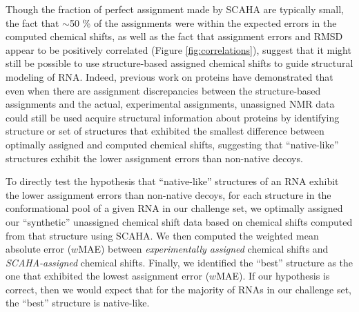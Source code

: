 \documentclass[journal=jcisd8,manuscript=article,layout=onecolumn]{achemso}
\begin{document}
{Though the fraction of perfect assignment made by SCAHA are typically small, the fact that $\sim$50 \% of the assignments were within the expected errors  in the computed chemical shifts, as well as the fact that assignment errors and RMSD appear to be positively correlated (Figure \ref{fig:correlations}), suggest that it  might still be possible to use structure-based assigned chemical shifts to guide structural modeling of RNA. Indeed, previous work on proteins have demonstrated that even when there are assignment discrepancies between the structure-based assignments and the actual, experimental assignments\cite{meiler2003rapid, bermejo2008deuterated, courtney2015experimental}, unassigned NMR data could still be used acquire structural information about proteins by identifying structure or set of structures that exhibited the smallest difference between optimally assigned and computed chemical shifts, suggesting that “native-like” structures exhibit the lower assignment errors than non-native decoys. 

To directly test the hypothesis that “native-like” structures of an RNA exhibit the lower assignment errors than non-native decoys, for each structure in the conformational pool of a given RNA in our challenge set, we optimally assigned our ``synthetic'' unassigned chemical shift data based on chemical shifts computed from that structure using SCAHA. We then computed the weighted mean absolute error ($w$MAE) between \textit{experimentally assigned} chemical shifts and \textit{SCAHA-assigned} chemical shifts.  Finally, we identified the ``best'' structure as the one that exhibited the lowest assignment error ($w$MAE). If our hypothesis is correct, then we would expect that for the majority of RNAs in our challenge set, the ``best'' structure is native-like. 

}
\end{document}
